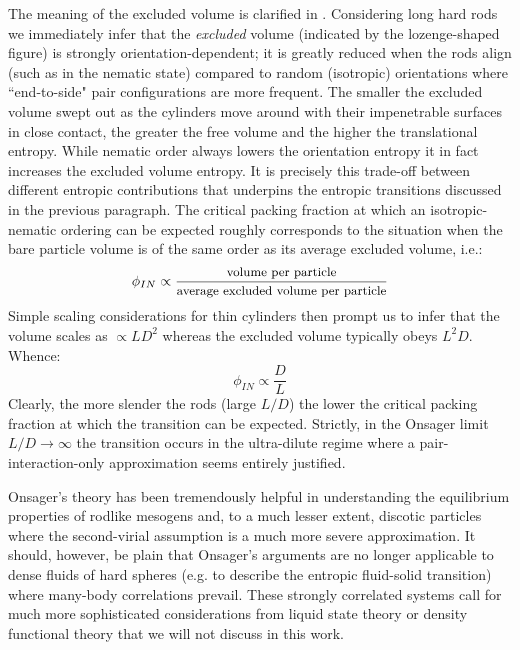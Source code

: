 \documentclass[amssymb]{revtex4}
\begin{document}
The meaning of the excluded volume is clarified in . Considering long hard rods we immediately infer that the {\em excluded} volume (indicated by the lozenge-shaped figure) is  strongly orientation-dependent;  it is  greatly reduced when the rods align (such as in the nematic state) compared to  random (isotropic) orientations  where ``end-to-side" pair configurations are more frequent.  The smaller the excluded volume swept out as the cylinders move around with their impenetrable surfaces  in close contact, the greater the free volume and the higher the translational entropy. While nematic order always lowers the orientation entropy it  in fact increases the excluded volume entropy. It is precisely this trade-off between different entropic contributions that underpins the entropic transitions discussed in the previous paragraph. The critical packing fraction at which an isotropic-nematic ordering can be expected roughly corresponds to the situation when the bare particle volume is of the same order as its average excluded volume, i.e.:
\begin{equation}
\phi_{IN} \propto \frac{\mbox{{\small volume per particle}}}{\mbox{{\small average excluded volume per particle}}}
\end{equation}
Simple scaling considerations for thin cylinders then prompt us to infer that the volume scales as $\propto LD^{2}$ whereas the excluded volume typically obeys $L^{2}D $. Whence: 
\begin{equation}
\phi_{IN} \propto \frac{D}{L}
\end{equation}
Clearly, the more slender the rods (large $L/D$) the lower the critical packing fraction at which the transition can be expected. Strictly, in the Onsager limit $L/D \rightarrow \infty$  the transition occurs in the ultra-dilute regime where a pair-interaction-only approximation seems entirely justified.  

Onsager's theory has been tremendously helpful in understanding the equilibrium properties of rodlike mesogens and, to a much lesser extent, discotic particles where the second-virial assumption is a much more severe approximation. 
 It should, however,  be plain that Onsager's arguments are no longer applicable to dense fluids of hard spheres (e.g. to describe the entropic fluid-solid transition) where many-body correlations prevail. These strongly correlated systems call for much more sophisticated considerations from liquid state theory \cite{singh_pr1991,likos_pr2001} or density functional  theory \cite{lowendft} that we will not discuss in this work. 
\end{document}
